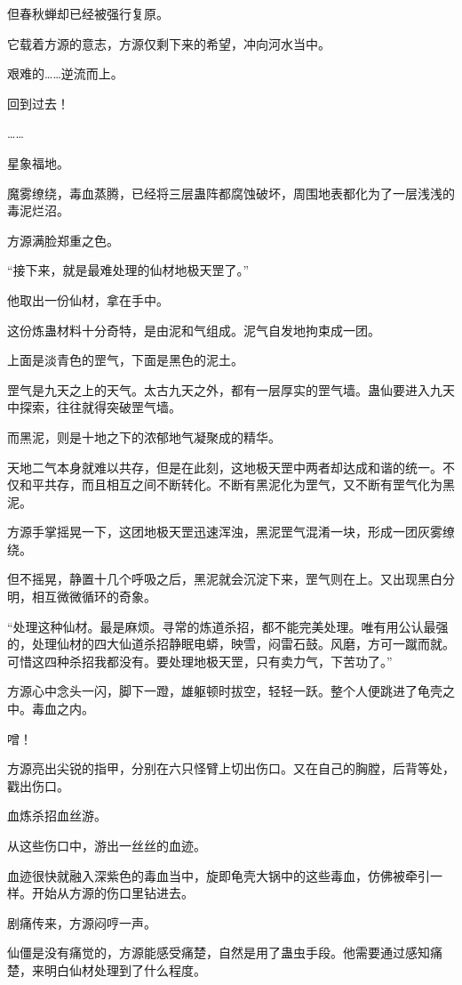 \begin{this_body}
但春秋蝉却已经被强行复原。

它载着方源的意志，方源仅剩下来的希望，冲向河水当中。

艰难的……逆流而上。

回到过去！

……

星象福地。

魔雾缭绕，毒血蒸腾，已经将三层蛊阵都腐蚀破坏，周围地表都化为了一层浅浅的毒泥烂沼。

方源满脸郑重之色。

“接下来，就是最难处理的仙材地极天罡了。”

他取出一份仙材，拿在手中。

这份炼蛊材料十分奇特，是由泥和气组成。泥气自发地拘束成一团。

上面是淡青色的罡气，下面是黑色的泥土。

罡气是九天之上的天气。太古九天之外，都有一层厚实的罡气墙。蛊仙要进入九天中探索，往往就得突破罡气墙。

而黑泥，则是十地之下的浓郁地气凝聚成的精华。

天地二气本身就难以共存，但是在此刻，这地极天罡中两者却达成和谐的统一。不仅和平共存，而且相互之间不断转化。不断有黑泥化为罡气，又不断有罡气化为黑泥。

方源手掌摇晃一下，这团地极天罡迅速浑浊，黑泥罡气混淆一块，形成一团灰雾缭绕。

但不摇晃，静置十几个呼吸之后，黑泥就会沉淀下来，罡气则在上。又出现黑白分明，相互微微循环的奇象。

“处理这种仙材。最是麻烦。寻常的炼道杀招，都不能完美处理。唯有用公认最强的，处理仙材的四大仙道杀招静眠电蟒，映雪，闷雷石鼓。风磨，方可一蹴而就。可惜这四种杀招我都没有。要处理地极天罡，只有卖力气，下苦功了。”

方源心中念头一闪，脚下一蹬，雄躯顿时拔空，轻轻一跃。整个人便跳进了龟壳之中。毒血之内。

噌！

方源亮出尖锐的指甲，分别在六只怪臂上切出伤口。又在自己的胸膛，后背等处，戳出伤口。

血炼杀招血丝游。

从这些伤口中，游出一丝丝的血迹。

血迹很快就融入深紫色的毒血当中，旋即龟壳大锅中的这些毒血，仿佛被牵引一样。开始从方源的伤口里钻进去。

剧痛传来，方源闷哼一声。

仙僵是没有痛觉的，方源能感受痛楚，自然是用了蛊虫手段。他需要通过感知痛楚，来明白仙材处理到了什么程度。


\end{this_body}
